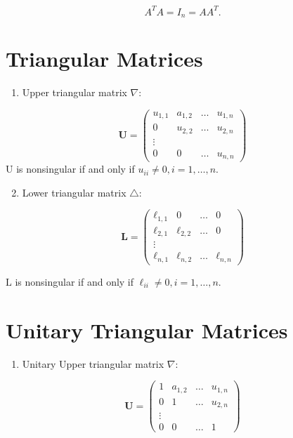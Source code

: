 \documentclass[11pt]{book}
\begin{document}
$$
A^{T} A=I_{n}=A A^{T}.
$$

\section*{Triangular Matrices}
\begin{enumerate}
  \item Upper triangular matrix $\nabla$:
\end{enumerate}

$$
\mathbf{U}=\left(\begin{array}{cccc}
u_{1,1} & a_{1,2} & \ldots & u_{1, n} \\
0 & u_{2,2} & \ldots & u_{2, n} \\
\vdots & & & \\
0 & 0 & \ldots & u_{n, n}
\end{array}\right)
$$
$\mathrm{U}$ is nonsingular if and only if $u_{i i} \neq 0, i=1, \ldots, n.$

\begin{enumerate}
  \setcounter{enumi}{1}
  \item Lower triangular matrix $\triangle$:
\end{enumerate}

$$
\mathbf{L}=\left(\begin{array}{cccc}
\ell_{1,1} & 0 & \ldots & 0 \\
\ell_{2,1} & \ell_{2,2} & \ldots & 0 \\
\vdots & & & \\
\ell_{n, 1} & \ell_{n, 2} & \ldots & \ell_{n, n}
\end{array}\right)
$$

$\mathrm{L}$ is nonsingular if and only if $\ell_{i i} \neq 0, i=1, \ldots, n.$

\section*{Unitary Triangular Matrices}
\begin{enumerate}
  \item Unitary Upper triangular matrix $\nabla$:
\end{enumerate}

$$
\mathbf{U}=\left(\begin{array}{cccc}
1 & a_{1,2} & \ldots & u_{1, n} \\
0 & 1 & \ldots & u_{2, n} \\
\vdots & & & \\
0 & 0 & \ldots & 1
\end{array}\right)
$$
\end{document}
